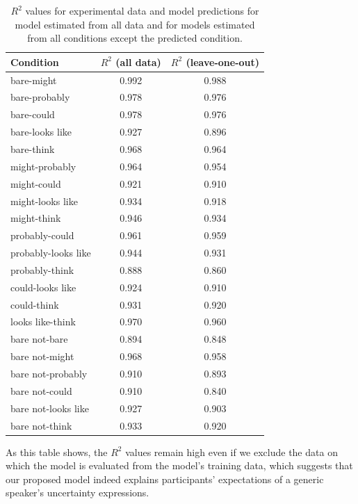\documentclass[man, floatsintext]{apa6}
\begin{document}
\begin{table}[ht!]
\center
\begin{tabular}{l | c | c}
      Condition & $R^2$ (all data) & $R^2$ (leave-one-out) \\
      \midrule
          bare-might  &  0.992  & 0.988 \\
       bare-probably  &  0.978  & 0.976 \\
          bare-could  &  0.978  & 0.976 \\
     bare-looks like  &  0.927  & 0.896 \\
          bare-think  &  0.968  & 0.964 \\
      might-probably  &  0.964  & 0.954 \\
         might-could  &  0.921  & 0.910 \\
    might-looks like  &  0.934  & 0.918 \\
         might-think  &  0.946  & 0.934 \\
      probably-could  &  0.961  & 0.959 \\
 probably-looks like  &  0.944  & 0.931 \\
      probably-think  &  0.888  & 0.860 \\
    could-looks like  &  0.924  & 0.910 \\
         could-think  &  0.931  & 0.920 \\
    looks like-think  &  0.970  & 0.960 \\
       bare not-bare  &  0.894  & 0.848 \\
      bare not-might  &  0.968  & 0.958 \\
   bare not-probably  &  0.910  & 0.893 \\
      bare not-could  &  0.910  & 0.840 \\
 bare not-looks like  &  0.927  & 0.903 \\
      bare not-think  &  0.933  & 0.920 \\
\end{tabular}
\caption{$R^2$ values for experimental data and model predictions for model estimated from all data and for models estimated from all conditions except the predicted condition. \label{tbl:correlations}}
\end{table}


As this table shows, the $R^2$ values remain high even if we exclude the data on which the model is evaluated from the model's training data, 
which suggests that our proposed model indeed explains
participants' expectations of a generic speaker's uncertainty expressions. 
\end{document}
